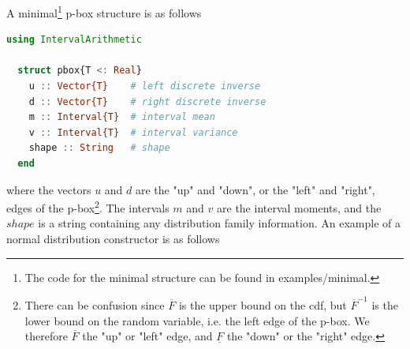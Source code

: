 \documentclass{juliacon}
\begin{document}
A minimal\footnote{The code for the minimal structure can be found in examples/minimal.} p-box structure is as follows
\begin{lstlisting}[language = Julia]
  using IntervalArithmetic

  struct pbox{T <: Real}
    u :: Vector{T}    # left discrete inverse
    d :: Vector{T}    # right discrete inverse
    m :: Interval{T}  # interval mean
    v :: Interval{T}  # interval variance
    shape :: String   # shape
  end
\end{lstlisting}
\noindent where the vectors $u$ and $d$ are the "up" and "down", or the "left" and "right", edges of the p-box\footnote{There can be confusion since $\overline{F}$ is the upper bound on the cdf, but $\overline{F}^{-1}$ is the lower bound on the random variable, i.e. the left edge of the p-box. We therefore $\overline{F}$ the "up" or "left" edge, and $\underline{F}$ the "down" or the "right" edge.}. The intervals $m$ and $v$ are the interval moments, and the $shape$ is a string containing any distribution family information. An example of a normal distribution constructor is as follows
\end{document}
